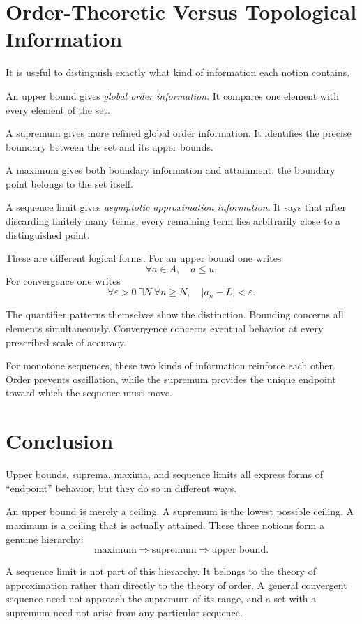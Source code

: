\documentclass{essay}
\begin{document}
\section{Order-Theoretic Versus Topological Information}

It is useful to distinguish exactly what kind of information each notion contains.

An upper bound gives \emph{global order information}. It compares one element with every element of the set.

A supremum gives more refined global order information. It identifies the precise boundary between the set and its upper bounds.

A maximum gives both boundary information and attainment: the boundary point belongs to the set itself.

A sequence limit gives \emph{asymptotic approximation information}. It says that after discarding finitely many terms, every remaining term lies arbitrarily close to a distinguished point.

These are different logical forms. For an upper bound one writes
\[ \forall a\in A,\quad a\leq u. \]
For convergence one writes
\[ \forall\varepsilon>0\ \exists N\ \forall n\geq N, \quad |a_{n}-L|<\varepsilon. \]

The quantifier patterns themselves show the distinction. Bounding concerns all elements simultaneously. Convergence concerns eventual behavior at every prescribed scale of accuracy.

For monotone sequences, these two kinds of information reinforce each other. Order prevents oscillation, while the supremum provides the unique endpoint toward which the sequence must move.

\section{Conclusion}

Upper bounds, suprema, maxima, and sequence limits all express forms of ``endpoint'' behavior, but they do so in different ways.

An upper bound is merely a ceiling. A supremum is the lowest possible ceiling. A maximum is a ceiling that is actually attained. These three notions form a genuine hierarchy:
\[ \text{maximum}\Longrightarrow\text{supremum}\Longrightarrow\text{upper bound}. \]

A sequence limit is not part of this hierarchy. It belongs to the theory of approximation rather than directly to the theory of order. A general convergent sequence need not approach the supremum of its range, and a set with a supremum need not arise from any particular sequence.
\end{document}
